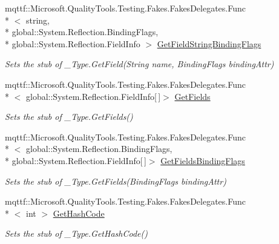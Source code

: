 \begin{DoxyCompactItemize}
mqttf\-::\-Microsoft.\-Quality\-Tools.\-Testing.\-Fakes.\-Fakes\-Delegates.\-Func\\*
$<$ string, \\*
global\-::\-System.\-Reflection.\-Binding\-Flags, \\*
global\-::\-System.\-Reflection.\-Field\-Info $>$ \hyperlink{class_system_1_1_runtime_1_1_interop_services_1_1_fakes_1_1_stub___type_a0a77e76c217ff638b38b9055d1e82b6b}{Get\-Field\-String\-Binding\-Flags}
\begin{DoxyCompactList}\small\item\em Sets the stub of \-\_\-\-Type.\-Get\-Field(\-String name, Binding\-Flags binding\-Attr)\end{DoxyCompactList}\item 
mqttf\-::\-Microsoft.\-Quality\-Tools.\-Testing.\-Fakes.\-Fakes\-Delegates.\-Func\\*
$<$ global\-::\-System.\-Reflection.\-Field\-Info\mbox{[}$\,$\mbox{]}$>$ \hyperlink{class_system_1_1_runtime_1_1_interop_services_1_1_fakes_1_1_stub___type_a0cd599523ba39075e0f8fa3d16a4f232}{Get\-Fields}
\begin{DoxyCompactList}\small\item\em Sets the stub of \-\_\-\-Type.\-Get\-Fields()\end{DoxyCompactList}\item 
mqttf\-::\-Microsoft.\-Quality\-Tools.\-Testing.\-Fakes.\-Fakes\-Delegates.\-Func\\*
$<$ global\-::\-System.\-Reflection.\-Binding\-Flags, \\*
global\-::\-System.\-Reflection.\-Field\-Info\mbox{[}$\,$\mbox{]}$>$ \hyperlink{class_system_1_1_runtime_1_1_interop_services_1_1_fakes_1_1_stub___type_a8c565f626aff4b4ddb6e2a543b511b7e}{Get\-Fields\-Binding\-Flags}
\begin{DoxyCompactList}\small\item\em Sets the stub of \-\_\-\-Type.\-Get\-Fields(\-Binding\-Flags binding\-Attr)\end{DoxyCompactList}\item 
mqttf\-::\-Microsoft.\-Quality\-Tools.\-Testing.\-Fakes.\-Fakes\-Delegates.\-Func\\*
$<$ int $>$ \hyperlink{class_system_1_1_runtime_1_1_interop_services_1_1_fakes_1_1_stub___type_a8108347536ca7ef135c46a38f058c3c1}{Get\-Hash\-Code}
\begin{DoxyCompactList}\small\item\em Sets the stub of \-\_\-\-Type.\-Get\-Hash\-Code()\end{DoxyCompactList}\item 

\end{DoxyCompactItemize}
